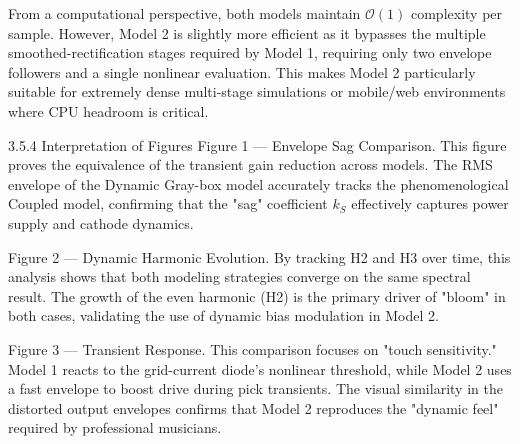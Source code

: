 From a computational perspective, both models maintain $\mathcal{O}(1)$ complexity per sample. However, Model 2 is slightly more efficient as it bypasses the multiple smoothed-rectification stages required by Model 1, requiring only two envelope followers and a single nonlinear evaluation. This makes Model 2 particularly suitable for extremely dense multi-stage simulations or mobile/web environments where CPU headroom is critical.

3.5.4 Interpretation of Figures
Figure 1 — Envelope Sag Comparison. This figure proves the equivalence of the transient gain reduction across models. The RMS envelope of the Dynamic Gray-box model accurately tracks the phenomenological Coupled model, confirming that the "sag" coefficient $k_S$ effectively captures power supply and cathode dynamics.

Figure 2 — Dynamic Harmonic Evolution. By tracking H2 and H3 over time, this analysis shows that both modeling strategies converge on the same spectral result. The growth of the even harmonic (H2) is the primary driver of "bloom" in both cases, validating the use of dynamic bias modulation in Model 2.

Figure 3 — Transient Response. This comparison focuses on "touch sensitivity." Model 1 reacts to the grid-current diode's nonlinear threshold, while Model 2 uses a fast envelope to boost drive during pick transients. The visual similarity in the distorted output envelopes confirms that Model 2 reproduces the "dynamic feel" required by professional musicians.
